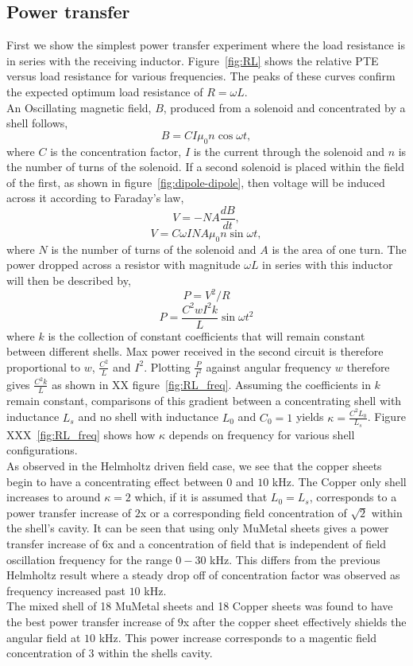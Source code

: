 \documentclass[11pt]{iopart}
\begin{document}
\subsection{Power transfer}
First we show the simplest power transfer experiment where the load
resistance is in series with the receiving
inductor. Figure~\ref{fig:RL} shows the relative PTE versus load
resistance for various frequencies. The peaks of these curves confirm
the expected optimum load resistance of $R = \omega
L$. \\
An Oscillating magnetic field, $B$, produced from a solenoid and
concentrated by a shell follows,
$$B = CI\mu_0n\cos{\omega t},$$
where $C$ is the concentration factor, $I$ is the current through the
solenoid and $n$ is the number of turns of the solenoid.  If a second
solenoid is placed within the field of the first, as shown in
figure~\ref{fig:dipole-dipole}, then voltage will be induced across it
according to Faraday's law,
$$V = -NA\frac{dB}{dt},$$
$$V = C\omega I NA\mu_0n\sin{\omega t},$$
where $N$ is the number of turns of the solenoid and $A$ is the area
of one turn.
The power dropped across a resistor with magnitude $\omega L$ in
series with this inductor will then be described by,
$$ P = V^2/R $$
$$ P = \frac{C^2wI^2k}{L}\sin{\omega t}^2$$
where $k$ is the collection of constant coefficients that will remain
constant between different shells.  Max power received in the second
circuit is therefore proportional to $w$, $\frac{C^2}{L}$ and
$I^2$. Plotting $\frac{P}{I^2}$ against angular frequency $w$
therefore gives $\frac{C^2k}{L}$ as shown in XX
figure~\ref{fig:RL_freq}. Assuming the coefficients in $k$ remain
constant, comparisons of this gradient between a concentrating shell
with inductance $L_s$ and no shell with inductance $L_0$ and $C_0 = 1$
yields $\kappa = \frac{C^2L_0}{L_s}$. Figure XXX~\ref{fig:RL_freq}
shows how $\kappa$ depends on frequency for various shell
configurations.\\
As observed in the Helmholtz driven field case, we see that the copper
sheets begin to have a concentrating effect between $0$ and $10$
kHz. The Copper only shell increases to around $\kappa = 2$ which, if
it is assumed that $L_0 = L_s$, corresponds to a power transfer
increase of $2$x or a corresponding field concentration of $\sqrt{2}$
within the shell's cavity. It can be seen that using only MuMetal
sheets gives a power transfer increase of $6$x and a concentration of
field that is independent of field oscillation frequency for the range
$0 - 30$ kHz. This differs from the previous Helmholtz result where a
steady drop off of concentration factor was observed as frequency
increased past $10$ kHz.\\
The mixed shell of 18 MuMetal sheets and 18 Copper sheets was found to
have the best power transfer increase of $9$x after the copper sheet
effectively shields the angular field at $10$ kHz. This power increase
corresponds to a magentic field concentration of $3$ within the shells
cavity.\\
\end{document}
